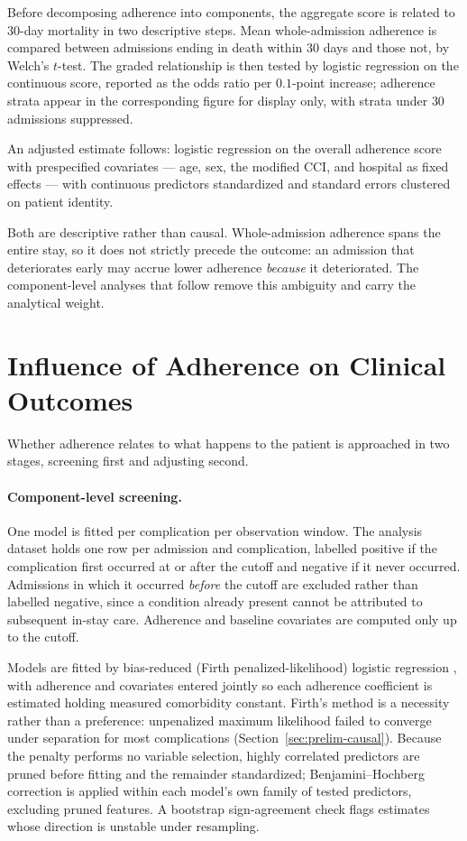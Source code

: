 Before decomposing adherence into components, the aggregate score is related to $30$-day mortality in two descriptive steps. Mean whole-admission adherence is compared between admissions ending in death within $30$ days and those not, by Welch's $t$-test. The graded relationship is then tested by logistic regression on the continuous score, reported as the odds ratio per $0.1$-point increase; adherence strata appear in the corresponding figure for display only, with strata under $30$ admissions suppressed.

An adjusted estimate follows: logistic regression on the overall adherence score with prespecified covariates --- age, sex, the modified CCI, and hospital as fixed effects --- with continuous predictors standardized and standard errors clustered on patient identity.

Both are descriptive rather than causal. Whole-admission adherence spans the entire stay, so it does not strictly precede the outcome: an admission that deteriorates early may accrue lower adherence \emph{because} it deteriorated. The component-level analyses that follow remove this ambiguity and carry the analytical weight.

\section{Influence of Adherence on Clinical Outcomes}
\label{sec:evalm-influence}
\label{sec:method-influence}

Whether adherence relates to what happens to the patient is approached in two stages, screening first and adjusting second.

\paragraph{Component-level screening.}
One model is fitted per complication per observation window. The analysis dataset holds one row per admission and complication, labelled positive if the complication first occurred at or after the cutoff and negative if it never occurred. Admissions in which it occurred \emph{before} the cutoff are excluded rather than labelled negative, since a condition already present cannot be attributed to subsequent in-stay care. Adherence and baseline covariates are computed only up to the cutoff.

Models are fitted by bias-reduced (Firth penalized-likelihood) logistic regression \citep{firth1993bias}, with adherence and covariates entered jointly so each adherence coefficient is estimated holding measured comorbidity constant. Firth's method is a necessity rather than a preference: unpenalized maximum likelihood failed to converge under separation for most complications (Section~\ref{sec:prelim-causal}). Because the penalty performs no variable selection, highly correlated predictors are pruned before fitting and the remainder standardized; Benjamini--Hochberg correction is applied within each model's own family of tested predictors, excluding pruned features. A bootstrap sign-agreement check flags estimates whose direction is unstable under resampling.

